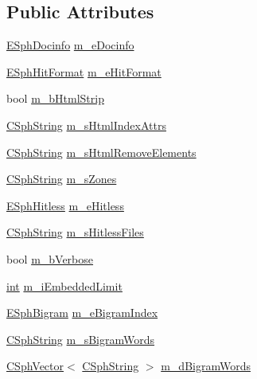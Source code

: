 \subsection*{Public Attributes}
\begin{DoxyCompactItemize}
\item 
\hyperlink{sphinx_8h_a50cf3b43c4c88b77dd63c2e8866524de}{E\-Sph\-Docinfo} \hyperlink{structCSphIndexSettings_a81ce517ddd7ea1a0109a99f3e5241df9}{m\-\_\-e\-Docinfo}
\item 
\hyperlink{sphinx_8h_a82ffff53ad1eb4da2ba352fcd9b2626c}{E\-Sph\-Hit\-Format} \hyperlink{structCSphIndexSettings_a5340224a86abea819cac6855d179d141}{m\-\_\-e\-Hit\-Format}
\item 
bool \hyperlink{structCSphIndexSettings_ae1dd4ac8cdbd6ad56f69a8c30b69a34c}{m\-\_\-b\-Html\-Strip}
\item 
\hyperlink{structCSphString}{C\-Sph\-String} \hyperlink{structCSphIndexSettings_a1b4ed025d401d167c9ecada92b20ef74}{m\-\_\-s\-Html\-Index\-Attrs}
\item 
\hyperlink{structCSphString}{C\-Sph\-String} \hyperlink{structCSphIndexSettings_a578cf0f2e803907f7f2b7e5cd7bfbce6}{m\-\_\-s\-Html\-Remove\-Elements}
\item 
\hyperlink{structCSphString}{C\-Sph\-String} \hyperlink{structCSphIndexSettings_a0ca140973f3fb0924ef0517bc2c7af2f}{m\-\_\-s\-Zones}
\item 
\hyperlink{sphinx_8h_a1920852c5151009d65cf2bc8204a685b}{E\-Sph\-Hitless} \hyperlink{structCSphIndexSettings_a72de6ec3c1d3603e0e4aa13747325d1d}{m\-\_\-e\-Hitless}
\item 
\hyperlink{structCSphString}{C\-Sph\-String} \hyperlink{structCSphIndexSettings_a54763be66ecf6ad50679947d32916900}{m\-\_\-s\-Hitless\-Files}
\item 
bool \hyperlink{structCSphIndexSettings_a70c5bbc07620bf5aeb1147a96e2d3187}{m\-\_\-b\-Verbose}
\item 
\hyperlink{sphinxexpr_8cpp_a4a26e8f9cb8b736e0c4cbf4d16de985e}{int} \hyperlink{structCSphIndexSettings_a8bbf7ab94d586324a2050de80ca999b3}{m\-\_\-i\-Embedded\-Limit}
\item 
\hyperlink{sphinx_8h_a4900146967791908ab838925add48e43}{E\-Sph\-Bigram} \hyperlink{structCSphIndexSettings_a7cca7fd0ef446a388f38ad1080d8ad59}{m\-\_\-e\-Bigram\-Index}
\item 
\hyperlink{structCSphString}{C\-Sph\-String} \hyperlink{structCSphIndexSettings_a9ebddbbb5ad262087aa3817f8dd6fced}{m\-\_\-s\-Bigram\-Words}
\item 
\hyperlink{classCSphVector}{C\-Sph\-Vector}$<$ \hyperlink{structCSphString}{C\-Sph\-String} $>$ \hyperlink{structCSphIndexSettings_a95319351433dbf22a5585640a87bd0ca}{m\-\_\-d\-Bigram\-Words}

\end{DoxyCompactItemize}
